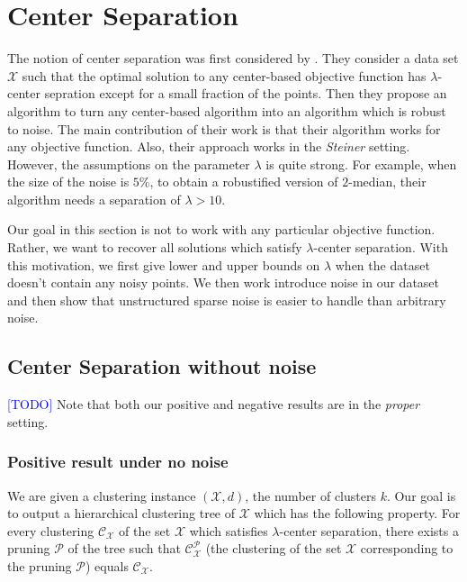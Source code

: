 \documentclass[anon,12pt]{colt2016} %
\newcommand{\mc}{\mathcal}
\newcommand{\todo}{\textcolor{blue}{[TODO]}\xspace}
\begin{document}
\section{Center Separation}

The notion of center separation was first considered by \cite{ben2014clustering}. They consider a data set $\mc X$ such that the optimal solution to any center-based objective function has $\lambda$-center sepration except for a small fraction of the points. Then they propose an algorithm to turn any center-based algorithm into an algorithm which is robust to noise. The main contribution of their work is that their algorithm works for any objective function. Also, their approach works in the {\it Steiner} setting. However, the assumptions on the parameter $\lambda$ is quite strong. For example, when the size of the noise is $5\%$, to obtain a robustified version of $2$-median, their algorithm needs a separation of $\lambda > 10$.

Our goal in this section is not to work with any particular objective function. Rather, we want to recover all solutions which satisfy $\lambda$-center separation. With this motivation, we first give lower and upper bounds on $\lambda$ when the dataset doesn't contain any noisy points. We then work introduce noise in our dataset and then show that unstructured sparse noise is easier to handle than arbitrary noise.
 
\subsection{Center Separation without noise}
\todo
Note that both our positive and negative results are in the {\it proper} setting.

\subsubsection{Positive result under no noise}
We are given a clustering instance $(\mc X, d)$, the number of clusters $k$. Our goal is to output a hierarchical clustering tree of $\mc X$ which has the following property. For every clustering $\mc C_{\mc X}$ of the set $\mc X$ which satisfies $\lambda$-center separation, there exists a pruning $\mc P$ of the tree such that $\mc C_{\mc X}^{\mc P}$ (the clustering of the set $\mc X$ corresponding to the pruning $\mc P$) equals $\mc C_{\mc X}$. 
\end{document}
